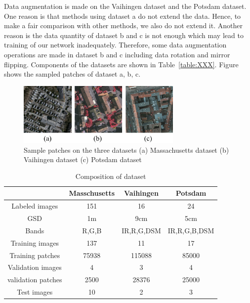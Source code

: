 Data augmentation is made on the Vaihingen dataset and the Potsdam dataset. 
One reason is that methods using dataset a do not extend the data. 
Hence, to make a fair comparison with other methods, we also do not extend it. 
Another reason is the data quantity of dataset b and c is not enough which may lead to training of our network inadequately. 
Therefore, some data augmentation operations are made in dataset b and c including data rotation and mirror flipping. 
Components of the datasets are shown in Table~\ref{table:XXX}. 
Figure  shows the sampled patches of dataset a, b, c.


\begin{figure}
\centering
\includegraphics[width=8cm]{Figures/datasets.eps}
\caption{Sample patches on the three datasets  (a) Massachusetts dataset (b) Vaihingen dataset (c) Potsdam dataset}
\label{5}
\end{figure}
\begin{table}
 \centering
 \caption{Composition of dataset}
 \begin{tabular}{c|ccc}
\hline
& Masschusetts & Vaihingen & Potsdam\\  \hline
Labeled images & 151& 16 &24\\ \hline
GSD & 1m & 9cm & 5cm\\ \hline
Bands & R,G,B & IR,R,G,DSM & IR,R,G,B,DSM\\ \hline
Training images &137 & 11 & 17\\ \hline
Training patches&75938 &115088 &85000\\ \hline
Validation images & 4 & 3 & 4\\ \hline
validation patches &2500 & 28376 &25000 \\\hline
Test images & 10 & 2 & 3\\ \hline
\end{tabular}
\end {table}



